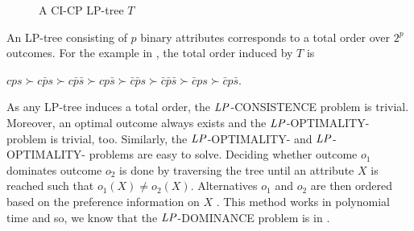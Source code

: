 \begin{figure}
   \small
	\centering

  
  \caption{A CI-CP LP-tree $T$}
  \label{fig:LPTree}
\end{figure}

An LP-tree consisting of $p$ binary attributes corresponds to a total order over
$2^p$ outcomes.  For the example in , the total order induced
by $T$ is
\begin{center}
	$cps \succ c\bar{p}s \succ c\bar{p}\bar{s} \succ cp\bar{s} 
		\succ \bar{c}\bar{p}s \succ \bar{c}\bar{p}\bar{s} \succ \bar{c}ps \succ \bar{c}p\bar{s}$.
\end{center}

As any LP-tree induces a total order, the $\mathit{LP}$-CONSISTENCE problem is trivial.
Moreover, an optimal outcome always exists and the $\mathit{LP}$-OPTIMALITY- problem
is trivial, too.  Similarly, the $\mathit{LP}$-OPTIMALITY- and
$\mathit{LP}$-OPTIMALITY- problems are easy to solve.
Deciding whether outcome $o_1$ dominates outcome $o_2$ is done by traversing the tree
until an attribute $X$ is reached such that
$o_1(X) \not = o_2(X)$.  Alternatives $o_1$ and $o_2$ are then ordered based on the preference
information on $X$ \cite{booth:learningLP}.
This method works in polynomial time and so, 
we know that the $\mathit{LP}$-DOMINANCE problem is in \bP.


